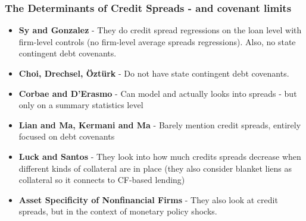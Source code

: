 \documentclass[12pt]{article}
\begin{document}
\subsubsection*{The Determinants of Credit Spreads - and covenant limits}
\begin{itemize}\setlength\itemsep{0em} \small
    \item \textbf{Sy and Gonzalez} - They do credit spread regressions on the loan level with firm-level controls (no firm-level average spreads regressions). Also, no state contingent debt covenants.
    \item \textbf{Choi, Drechsel, Öztürk} - Do not have state contingent debt covenants.
    \item \textbf{Corbae and D'Erasmo} - Can model and actually looks into spreads - but only on a summary statistics level
    \item \textbf{Lian and Ma, Kermani and Ma} - Barely mention credit spreads, entirely focused on debt covenants 
    \item \textbf{Luck and Santos} - They look into how much credits spreads decrease when different kinds of collateral are in place (they also consider blanket liens as collateral so it connects to CF-based lending)
    \item \textbf{Asset Specificity of Nonfinancial Firms} - They also look at credit spreads, but in the context of monetary policy shocks.
\end{itemize} \normalsize
\end{document}
